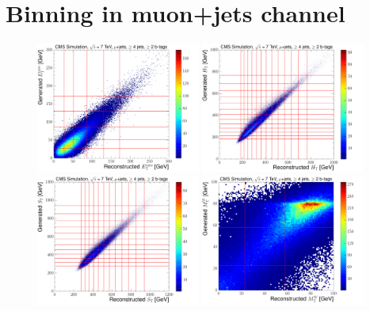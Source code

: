\section{Binning in muon+jets channel}
\label{as:binning_muon}

\begin{figure}[hbtp]
    \centering
     \includegraphics[width=0.48\textwidth]{Chapters/04_Analysis/04b_XSections/images/binning/muon_MET_7TeV.pdf}\hfill
     \includegraphics[width=0.48\textwidth]{Chapters/04_Analysis/04b_XSections/images/binning/muon_HT_7TeV.pdf}\\
     \includegraphics[width=0.48\textwidth]{Chapters/04_Analysis/04b_XSections/images/binning/muon_ST_7TeV.pdf}\hfill
     \includegraphics[width=0.48\textwidth]{Chapters/04_Analysis/04b_XSections/images/binning/muon_MT_7TeV.pdf}\\

\end{figure}
